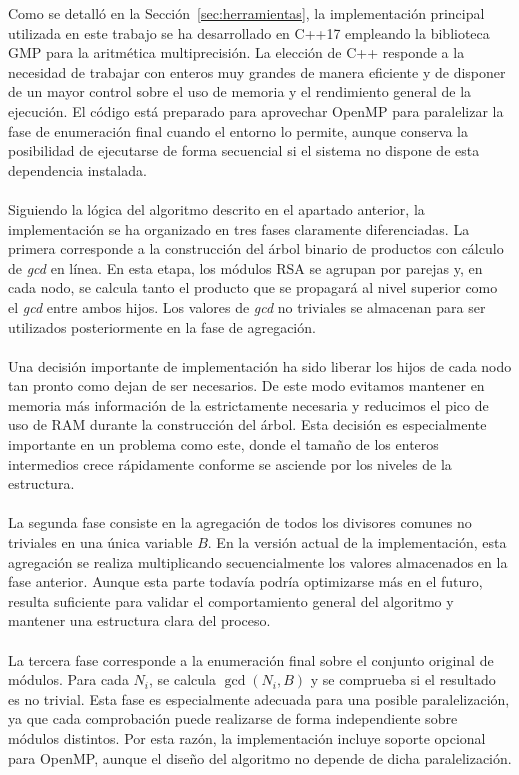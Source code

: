 Como se detalló en la Sección~\ref{sec:herramientas}, la implementación principal utilizada en este trabajo se ha desarrollado en C++17 empleando la biblioteca GMP para la aritmética multiprecisión. La elección de C++ responde a la necesidad de trabajar con enteros muy grandes de manera eficiente y de disponer de un mayor control sobre el uso de memoria y el rendimiento general de la ejecución. El código está preparado para aprovechar OpenMP para paralelizar la fase de enumeración final cuando el entorno lo permite, aunque conserva la posibilidad de ejecutarse de forma secuencial si el sistema no dispone de esta dependencia instalada.
\\
\\
Siguiendo la lógica del algoritmo descrito en el apartado anterior, la implementación se ha organizado en tres fases claramente diferenciadas. La primera corresponde a la construcción del árbol binario de productos con cálculo de \textit{gcd} en línea. En esta etapa, los módulos RSA se agrupan por parejas y, en cada nodo, se calcula tanto el producto que se propagará al nivel superior como el \textit{gcd} entre ambos hijos. Los valores de \textit{gcd} no triviales se almacenan para ser utilizados posteriormente en la fase de agregación.
\\
\\
Una decisión importante de implementación ha sido liberar los hijos de cada nodo tan pronto como dejan de ser necesarios. De este modo evitamos mantener en memoria más información de la estrictamente necesaria y reducimos el pico de uso de RAM durante la construcción del árbol. Esta decisión es especialmente importante en un problema como este, donde el tamaño de los enteros intermedios crece rápidamente conforme se asciende por los niveles de la estructura.
\\
\\
La segunda fase consiste en la agregación de todos los divisores comunes no triviales en una única variable \(B\). En la versión actual de la implementación, esta agregación se realiza multiplicando secuencialmente los valores almacenados en la fase anterior. Aunque esta parte todavía podría optimizarse más en el futuro, resulta suficiente para validar el comportamiento general del algoritmo y mantener una estructura clara del proceso.
\\
\\
La tercera fase corresponde a la enumeración final sobre el conjunto original de módulos. Para cada \(N_i\), se calcula \(\gcd(N_i,B)\) y se comprueba si el resultado es no trivial. Esta fase es especialmente adecuada para una posible paralelización, ya que cada comprobación puede realizarse de forma independiente sobre módulos distintos. Por esta razón, la implementación incluye soporte opcional para OpenMP, aunque el diseño del algoritmo no depende de dicha paralelización.

